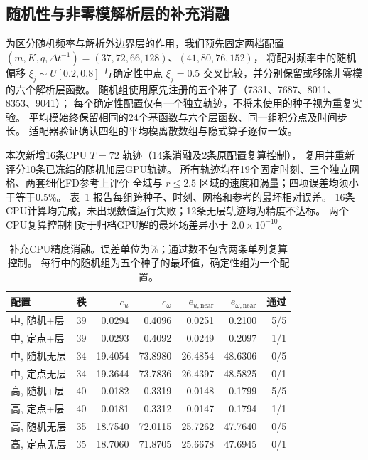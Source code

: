 \subsection{随机性与非零模解析层的补充消融}
\label{sec:review-ablation}
为区分随机频率与解析外边界层的作用，我们预先固定两档配置
$(m,K,q,\Delta t^{-1})=(37,72,66,128)$、$(41,80,76,152)$，
将配对频率中的随机偏移 $\xi_j\sim U[0.2,0.8]$ 与确定性中点
$\xi_j=0.5$ 交叉比较，并分别保留或移除非零模的六个解析层函数。
随机组使用原先注册的五个种子（7331、7687、8011、8353、9041）；
每个确定性配置仅有一个独立轨迹，不将未使用的种子视为重复实验。
平均模始终保留相同的24个基函数与六个层函数、同一组积分点及时间步长。
适配器验证确认四组的平均模离散数组与隐式算子逐位一致。

本次新增16条CPU $T=72$ 轨迹（14条消融及2条原配置复算控制），
复用并重新评分10条已冻结的随机加层GPU轨迹。
所有轨迹均在19个固定时刻、三个独立网格、两套细化FD参考上评价
全域与 $r\leq2.5$ 区域的速度和涡量；四项误差均须小于等于0.5\%。
表~\ref{tab:review-ablation} 报告每组跨种子、时刻、网格和参考的最坏相对误差。
16条CPU计算均完成，未出现数值运行失败；12条无层轨迹均为精度不达标。
两个CPU复算控制相对于归档GPU解的最坏场差异小于 $2.0\times10^{-10}$。

\begin{table}[htbp]
\centering\small
\caption{补充CPU精度消融。误差单位为\%；通过数不包含两条单列复算控制。
每行中的随机组为五个种子的最坏值，确定性组为一个配置。}
\label{tab:review-ablation}
\begin{tabular}{lrrrrrr}
\hline
配置 & 秩 & $e_u$ & $e_\omega$ & $e_{u,\mathrm{near}}$ & $e_{\omega,\mathrm{near}}$ & 通过 \\
\hline
中, 随机+层 & 39 & 0.0294 & 0.4096 & 0.0251 & 0.2100 & 5/5 \\
中, 定点+层 & 39 & 0.0293 & 0.4092 & 0.0249 & 0.2097 & 1/1 \\
中, 随机无层 & 34 & 19.4054 & 73.8980 & 26.4854 & 48.6306 & 0/5 \\
中, 定点无层 & 34 & 19.3644 & 73.7836 & 26.4397 & 48.5825 & 0/1 \\
高, 随机+层 & 40 & 0.0182 & 0.3319 & 0.0148 & 0.1799 & 5/5 \\
高, 定点+层 & 40 & 0.0181 & 0.3312 & 0.0147 & 0.1794 & 1/1 \\
高, 随机无层 & 35 & 18.7540 & 72.0115 & 25.7262 & 47.7640 & 0/5 \\
高, 定点无层 & 35 & 18.7060 & 71.8705 & 25.6678 & 47.6945 & 0/1 \\
\hline
\end{tabular}
\end{table}

